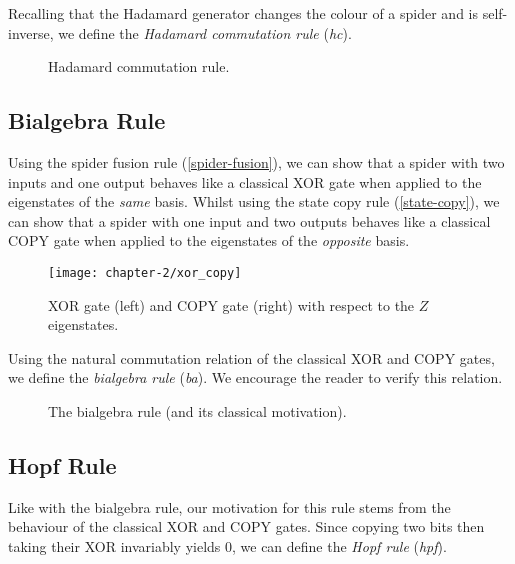 Recalling that the Hadamard generator changes the colour of a spider and is self-inverse, we define the \textit{Hadamard commutation rule} (\textit{hc}).

\begin{figure}[H]
    \centering
    \caption{Hadamard commutation rule.}
    \label{hadamard-commutation}
\end{figure}


\subsection{Bialgebra Rule}

Using the spider fusion rule (\ref{spider-fusion}), we can show that a spider with two inputs and one output behaves like a classical XOR gate when applied to the eigenstates of the \textit{same} basis. Whilst using the state copy rule (\ref{state-copy}), we can show that a spider with one input and two outputs behaves like a classical COPY gate when applied to the eigenstates of the \textit{opposite} basis.

\begin{figure}[H]
    \centering
    \texttt{[image: chapter-2/xor\_copy]}
    \caption{XOR gate (left) and COPY gate (right) with respect to the $Z$ eigenstates.}
    \label{xor}
    \label{copy}
\end{figure}

Using the natural commutation relation of the classical XOR and COPY gates, we define the \textit{bialgebra rule} (\textit{ba}). We encourage the reader to verify this relation.

\begin{figure}[H]
    \centering
    \caption{The bialgebra rule (and its classical motivation).}
    \label{bialgebra}
\end{figure}


\subsection{Hopf Rule}

Like with the bialgebra rule, our motivation for this rule stems from the behaviour of the classical XOR and COPY gates. Since copying two bits then taking their XOR invariably yields 0, we can define the \textit{Hopf rule} (\textit{hpf}).

